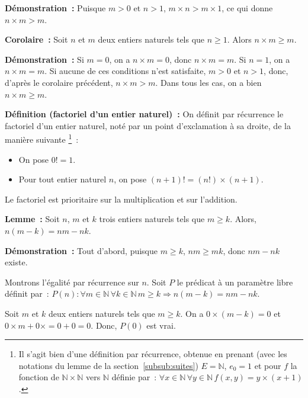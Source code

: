 \noindent\textbf{Démonstration :} Puisque $m > 0$ et $n > 1$, $m \times n > m \times 1$, ce qui donne $n \times m > m$.

   \done 

\medskip

\noindent\textbf{Corolaire :} Soit $n$ et $m$ deux entiers naturels tels que $n \geq 1$. 
    Alors $n \times m \geq m$.

\medskip

\noindent\textbf{Démonstration :} 
    Si $m = 0$, on a $n \times m = 0$, donc $n \times m = m$.
    Si $n = 1$, on a $n \times m = m$.
    Si aucune de ces conditions n'est satisfaite, $m > 0$ et $n > 1$, donc, d'après le corolaire précédent, $n \times m > m$.
    Dans tous les cas, on a bien $n \times m \geq m$.

   \done 

\medskip

\noindent\textbf{Définition (factoriel d'un entier naturel) :} On définit par récurrence le factoriel d'un entier naturel, noté par un point d'exclamation à sa droite, de la manière suivante%
\footnote{
    Il s'agit bien d'une définition par récurrence, obtenue en prenant (avec les notations du lemme de la section~\ref{subsub:suites}) $E = \mathbb{N}$, $e_0 = 1$ et pour $f$ la fonction de $\mathbb{N} \times \mathbb{N}$ vers $\mathbb{N}$ définie par : $\forall x \in \mathbb{N} \, \forall y \in \mathbb{N} \, f(x,y) = y \times (x+1)$.
}~:
\begin{itemize}[nosep]
    \item On pose $0! = 1$.
    \item Pour tout entier naturel $n$, on pose $(n+1)! = (n!) \times (n+1)$.
\end{itemize}
Le factoriel est prioritaire sur la multiplication et sur l'addition. 

\medskip

\noindent\textbf{Lemme :} Soit $n$, $m$ et $k$ trois entiers naturels tels que $m \geq k$.
    Alors, $n (m - k) = n m - n k$.

\medskip

\noindent\textbf{Démonstration :} 
    Tout d'abord, puisque $m \geq k$, $n m \geq m k$, donc $n m - n k$ existe.

    Montrons l'égalité par récurrence sur $n$. 
    Soit $P$ le prédicat à un paramètre libre définit par : $P(n): \forall m \in \mathbb{N} \, \forall k \in \mathbb{N} \, m \geq k \Rightarrow n (m-k) = n m - n k$. 
    
    Soit $m$ et $k$ deux entiers naturels tels que $m \geq k$.
    On a $0 \times (m-k) = 0$ et $0 \times m + 0 \times = 0 + 0 = 0$.
    Donc, $P(0)$ est vrai.

